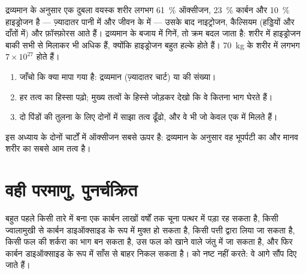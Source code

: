 \begin{proposition}[हम किससे बने हैं]\label{prop:g9:elements-universe-earth:body}
द्रव्यमान के अनुसार एक दुबला वयस्क शरीर लगभग \qty{61}{\percent} ऑक्सीजन,
\qty{23}{\percent} कार्बन और \qty{10}{\percent} हाइड्रोजन है ---
ज़्यादातर पानी में और जीवन के  में --- उसके बाद नाइट्रोजन, कैल्सियम (हड्डियों
और दाँतों में) और फ़ॉस्फ़ोरस आते हैं। द्रव्यमान के बजाय  में गिनें, तो
क्रम बदल जाता है: शरीर में हाइड्रोजन  बाकी सभी  से मिलाकर भी अधिक
हैं, क्योंकि हाइड्रोजन  बहुत हल्के होते हैं। \qty{70}{kg} के शरीर में
लगभग $7 \times 10^{27}$  होते हैं।
\end{proposition}

\begin{method}[प्रचुरता का चार्ट पढ़ना]\label{met:g9:elements-universe-earth:read}
\begin{enumerate}
  \item जाँचो कि क्या मापा गया है: द्रव्यमान (ज़्यादातर चार्ट) या  की संख्या।
  \item हर तत्व का हिस्सा पढ़ो; मुख्य तत्वों के हिस्से जोड़कर देखो कि वे
        कितना भाग घेरते हैं।
  \item दो पिंडों की तुलना के लिए दोनों में साझा तत्व ढूँढो, और वे भी जो
        केवल एक में मिलते हैं।
\end{enumerate}
इस अध्याय के दोनों चार्टों में ऑक्सीजन सबसे ऊपर है: द्रव्यमान के अनुसार वह
भूपर्पटी का और मानव शरीर का सबसे आम तत्व है।
\end{method}

\section{वही परमाणु, पुनर्चक्रित}

\begin{example}[एक कार्बन परमाणु की यात्रा]\label{ex:g9:elements-universe-earth:journey}
बहुत पहले किसी तारे में बना एक कार्बन  लाखों वर्षों तक चूना पत्थर में
पड़ा रह सकता है, किसी ज्वालामुखी से कार्बन डाइऑक्साइड के रूप में मुक्त हो सकता है,
किसी पत्ती द्वारा लिया जा सकता है, किसी फल की शर्करा का भाग बन सकता है, उस फल
को खाने वाले जंतु में जा सकता है, और फिर कार्बन डाइऑक्साइड के रूप में साँस से
बाहर निकल सकता है।   को नष्ट नहीं करते: वे आगे
सौंप दिए जाते हैं।
\end{example}

